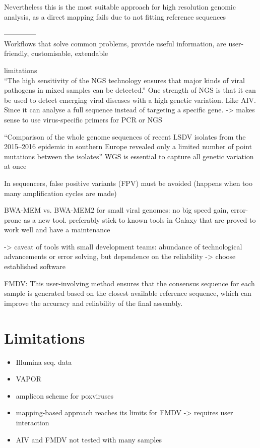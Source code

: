 Nevertheless this is the most suitable approach for high resolution genomic analysis, as a direct mapping fails due to not fitting reference sequences

--------------\\
Workflows that solve common problems, provide useful information, are user-friendly, customisable, extendable

limitations \\

``The high sensitivity of the \ac{NGS} technology ensures that major kinds of viral pathogens in mixed samples can be detected.''
One strength of \ac{NGS} is that it can be used to detect emerging viral diseases with a high genetic variation. Like \ac{AIV}. Since it can analyse a full sequence instead of targeting a specific gene. -> makes sense to use virus-specific primers for \ac{PCR} or \ac{NGS} 

``Comparison of the whole genome sequences of recent \ac{LSDV} isolates from the 2015–2016 epidemic in southern Europe revealed only a limited number of point mutations between the isolates'' \ac{WGS} is essential to capture all genetic variation at once

In sequencers, false positive variants (\ac{FPV}) must be avoided (happens when too many amplification cycles are made)

BWA-MEM vs. BWA-MEM2 for small viral genomes: no big speed gain, error-prone as a new tool. preferably stick to known tools in Galaxy that are proved to work well and have a maintenance

-> caveat of tools with small development teams: abundance of technological advancements or error solving, but dependence on the reliability -> choose established software



FMDV: This user-involving method ensures that the consensus sequence for each sample is generated based on the closest available reference sequence, which can improve the accuracy and reliability of the final assembly. 

\section{Limitations}
\todoit
\begin{itemize}
    \item Illumina seq. data
    \item VAPOR 
    \item amplicon scheme for poxviruses
    \item mapping-based approach reaches its limits for FMDV -> requires user interaction
    \item AIV and FMDV not tested with many samples
\end{itemize}


